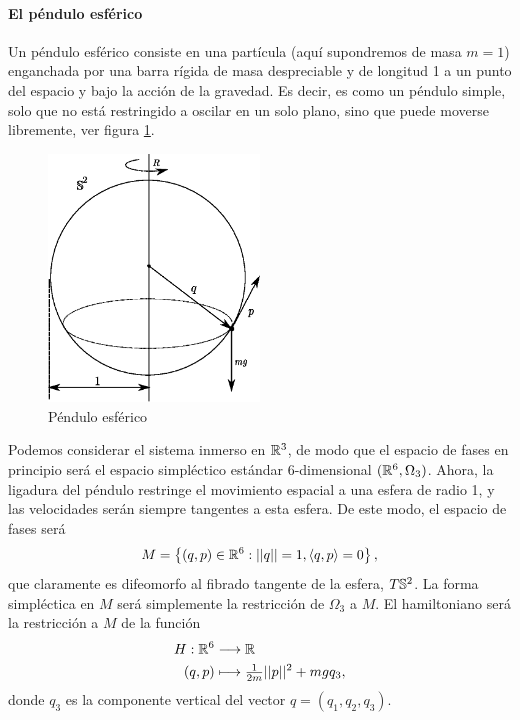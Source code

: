    \paragraph{\bf El péndulo esférico}\mbox{}

   Un péndulo esférico consiste en una partícula (aquí supondremos de masa $m=1$) enganchada por una barra rígida de masa despreciable y de longitud 1 a un punto del espacio y bajo la acción de la gravedad. Es decir, es como un péndulo simple, solo que no está restringido a oscilar en un solo plano, sino que puede moverse libremente, ver figura \ref{fig:espendulo}.
\begin{figure}[h]
  \centering
  \includegraphics[width=0.5\textwidth]{pics/espendulo.eps}
  \caption{\small Péndulo esférico}
  \label{fig:espendulo}
\end{figure}

Podemos considerar el sistema inmerso en $\mathbb{R}^3$, de modo que el espacio de fases en principio será el espacio simpléctico estándar $6$-dimensional $(\mathbb{R}^6,\Omega_3)$. Ahora, la ligadura del péndulo restringe el movimiento espacial a una esfera de radio 1, y las velocidades serán siempre tangentes a esta esfera. De este modo, el espacio de fases será
\begin{equation*}
  M=\left\{ (q,p)\in \mathbb{R}^6 : ||q||=1, \left\langle q,p\right\rangle=0 \right\},
\end{equation*}
que claramente es difeomorfo al fibrado tangente de la esfera, $T\mathbb{S}^2$. La forma simpléctica en $M$ será simplemente la restricción de $\Omega_3$ a $M$. El hamiltoniano será la restricción a $M$ de la función 
\begin{align*}
  H :\mathbb{R}^6&\longrightarrow \mathbb{R}\\ 
  (q,p) &\longmapsto \tfrac{1}{2m}||p||^2+mgq_3, 
  \end{align*}
  donde $q_3$ es la componente vertical del vector $q=(q_1,q_2,q_3)$.

